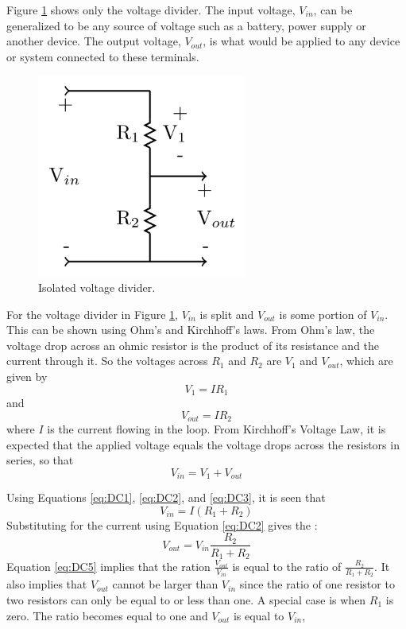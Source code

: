 \documentclass[12pt, a4paper, oneside, openright, titlepage]{book}
\begin{document}
\noindent Figure \ref{fig:DC5} shows only the voltage divider. The input voltage, $V_{in}$, can be generalized to be any source of voltage such as a battery, power supply or another device. The output voltage, $V_{out}$, is what would be applied to any device or system connected to these terminals.

\begin{figure}[H]
    \centering
    \includegraphics[scale = 0.8]{Images/DC5.PNG}
    \caption{Isolated voltage divider.}
    \label{fig:DC5}
\end{figure}


For the voltage divider in Figure \ref{fig:DC5}, $V_{in}$ is split and $V_{out}$ is some portion of $V_{in}$. This can be shown using Ohm's and Kirchhoff's laws. From Ohm's law, the voltage drop across an ohmic resistor is the product of its resistance and the current through it. So the voltages across $R_1$ and $R_2$ are $V_1$ and $V_{out}$, which are given by \begin{equation}\label{eq:DC1}
    V_1 = IR_1
\end{equation}
and \begin{equation}\label{eq:DC2}
    V_{out} = IR_2
\end{equation}
where $I$ is the current flowing in the loop. From Kirchhoff's Voltage Law, it is expected that the applied voltage equals the voltage drops across the resistors in series, so that \begin{equation}\label{eq:DC3}
    V_{in} = V_1 + V_{out}
\end{equation}

Using Equations \ref{eq:DC1}, \ref{eq:DC2}, and \ref{eq:DC3}, it is seen that \begin{equation}\label{eq:DC4}
    V_{in} = I(R_1+R_2)
\end{equation}
Substituting for the current using Equation \ref{eq:DC2} gives the : \begin{equation}\label{eq:DC5}
    V_{out} = V_{in}\frac{R_2}{R_1+R_2}
\end{equation}
Equation \ref{eq:DC5} implies that the ration $\frac{V_{out}}{V_{in}}$ is equal to the ratio of $\frac{R_2}{R_1+R_2}$. It also implies that $V_{out}$ cannot be larger than $V_{in}$ since the ratio of one resistor to two resistors can only be equal to or less than one. A special case is when $R_1$ is zero. The ratio becomes equal to one and $V_{out}$ is equal to $V_{in}$,
\end{document}
